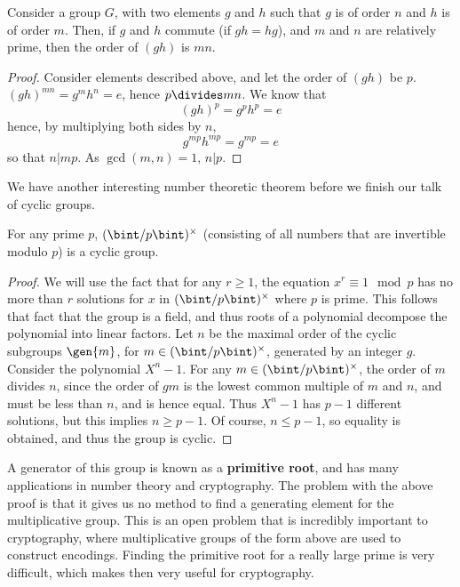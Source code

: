 \begin{theorem}
    Consider a group $G$, with two elements $g$ and $h$ such that $g$ is of order $n$ and $h$ is of order $m$. Then, if $g$ and $h$ commute (if $gh = hg$), and $m$ and $n$ are relatively prime, then the order of $(gh)$ is $mn$.
\end{theorem}
\begin{proof}
    Consider elements described above, and let the order of $(gh)$ be $p$. $(gh)^{mn} = g^mh^n = e$, hence $p \divides mn$. We know that
    \[ (gh)^p = g^ph^p = e \]
    hence, by multiplying both sides by $n$,
    \[ g^{mp}h^{mp} = g^{mp} = e \]
    so that $n | mp$. As $\gcd(m,n) = 1$, $n | p$.
\end{proof}

We have another interesting number theoretic theorem before we finish our talk of cyclic groups.

\begin{theorem}
    For any prime $p$, $(\bint/p\bint)^\times$ (consisting of all numbers that are invertible modulo $p$) is a cyclic group.
\end{theorem}
\begin{proof}
    We will use the fact that for any $r \geq 1$, the equation $x^r \equiv 1 \mod{p}$ has no more than $r$ solutions for $x$ in $(\bint/p\bint)^\times$ where $p$ is prime. This follows that fact that the group is a field, and thus roots of a polynomial decompose the polynomial into linear factors. Let $n$ be the maximal order of the cyclic subgroups $\gen{m}$, for $m \in (\bint/p\bint)^\times$, generated by an integer $g$. Consider the polynomial $X^n - 1$. For any $m \in (\bint/p\bint)^\times$, the order of $m$ divides $n$, since the order of $gm$ is the lowest common multiple of $m$ and $n$, and must be less than $n$, and is hence equal. Thus $X^n - 1$ has $p - 1$ different solutions, but this implies $n \geq p - 1$. Of course, $n \leq p - 1$, so equality is obtained, and thus the group is cyclic.
\end{proof}

A generator of this group is known as a {\bf primitive root}, and has many applications in number theory and cryptography. The problem with the above proof is that it gives us no method to find a generating element for the multiplicative group. This is an open problem that is incredibly important to cryptography, where multiplicative groups of the form above are used to construct encodings. Finding the primitive root for a really large prime is very difficult, which makes then very useful for cryptography.




